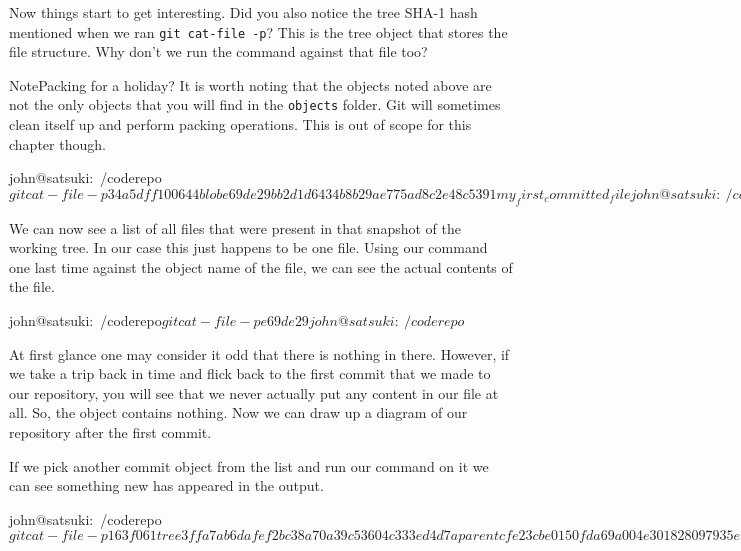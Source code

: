 Now things start to get interesting.
Did you also notice the tree SHA-1 hash mentioned when we ran \texttt{git cat-file -p}? This is the tree object that stores the file structure.
Why don't we run the command against that file too?

\begin{callout}{Note}{Packing for a holiday?}
It is worth noting that the objects noted above are not the only objects that you will find in the \texttt{objects} folder.
Git will sometimes clean itself up and perform packing operations.
This is out of scope for this chapter though.
\end{callout}

\begin{code}
john@satsuki:~/coderepo$ git cat-file -p 34a5dff
100644 blob e69de29bb2d1d6434b8b29ae775ad8c2e48c5391
 my_first_committed_file
john@satsuki:~/coderepo$
\end{code}

We can now see a list of all files that were present in that snapshot of the working tree.
In our case this just happens to be one file.
Using our command one last time against the object name of the file, we can see the actual contents of the file.

\begin{code}
john@satsuki:~/coderepo$ git cat-file -p e69de29
john@satsuki:~/coderepo$
\end{code}

At first glance one may consider it odd that there is nothing in there.
However, if we take a trip back in time and flick back to the first commit that we made to our repository, you will see that we never actually put any content in our file at all.
So, the object contains nothing.
Now we can draw up a diagram of our repository after the first commit.


If we pick another commit object from the list and run our command on it we can see something new has appeared in the output.

\begin{code}
john@satsuki:~/coderepo$ git cat-file -p 163f061
tree 3ffa7ab6dafef2bc38a70a39c53604c333ed4d7a
parent cfe23cbe0150fda69a004e301828097935ec4397
author John Haskins <john.haskins@tamagoyakiinc.koala> 1301599979 +0100
committer John Haskins <john.haskins@tamagoyakiinc.koala> 1301599979 +0100

Made a few changes to first and second files
john@satsuki:~/coderepo$
\end{code}

